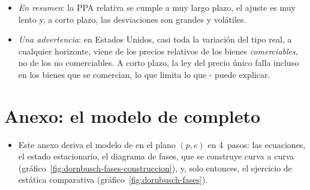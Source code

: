 \documentclass[11pt]{article}
\begin{document}
\begin{itemize}
  \begin{itemize}
  \item \emph{la no linealidad}: con costes de transporte y costes hundidos de entrar en el mercado, el tipo real se mueve sin volver mientras no supera los umbrales que hacen rentable el arbitraje; si los supera, empieza el arbitraje, más intenso cuanto mayor es la desviación. Los modelos no lineales se ajustan bien a los tipos de cambio desde 1973 y dan velocidades de ajuste mayores que los lineales: con perturbaciones del 1~al 5~\%, vidas medias inferiores a 3~años, y con las mayores, mucho menores\nocite{TaylorPeelSarno2001Nonlinear,TaylorTaylor2004PPP};
  \item \emph{el sesgo de agregación}: los precios de los distintos bienes vuelven a velocidades distintas, y mezclarlos en un índice exagera la persistencia\nocite{ImbsEtAl2005PPP};
  \item \emph{un equilibrio que se mueve}: si el tipo real de equilibrio cambia con la productividad (\ref{sec:balassa-samuelson}), medir la vuelta a una media fija la hace parecer más lenta de lo que es\nocite{ChongJordaTaylor2012Harrod}.
  \end{itemize}
\item \emph{En resumen}: la PPA relativa se cumple a muy largo plazo, el ajuste es muy lento y, a corto plazo, las desviaciones son grandes y volátiles.
\item \emph{Una advertencia}: en Estados Unidos, casi toda la variación del tipo real, a cualquier horizonte, viene de los precios relativos de los bienes \emph{comerciables}, no de los no comerciables\nocite{Engel1999Accounting}. A corto plazo, la ley del precio único falla incluso en los bienes que se comercian, lo que limita lo que - puede explicar.
\end{itemize}

\section{Anexo: el modelo de  completo}\label{anexo:dornbusch}

\begin{itemize}
\item Este anexo deriva el modelo de \textcite{Dornbusch1976Expectations} en el plano $(p,e)$ en 4~pasos: las ecuaciones, el estado estacionario, el diagrama de fases, que se construye curva a curva (gráfico~\ref{fig:dornbusch-fases-construccion}), y, solo entonces, el ejercicio de estática comparativa (gráfico~\ref{fig:dornbusch-fases}).
\end{itemize}
\end{document}
